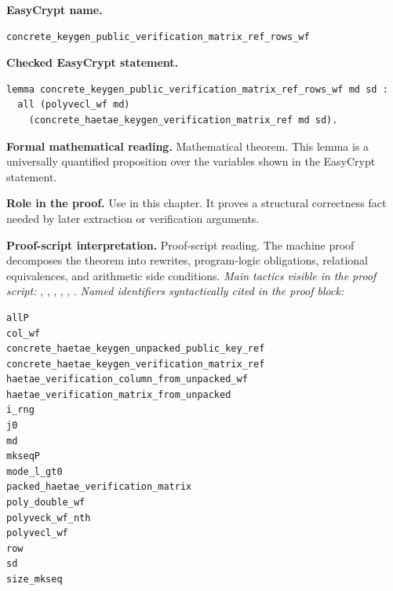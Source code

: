 \begin{formaltheorem}
\noindent\textbf{EasyCrypt name.}
\begin{lstlisting}[language=EasyCrypt,basicstyle=\ttfamily\scriptsize]
concrete_keygen_public_verification_matrix_ref_rows_wf
\end{lstlisting}
\noindent\textbf{Checked EasyCrypt statement.}
\begin{lstlisting}[language=EasyCrypt,basicstyle=\ttfamily\scriptsize]
lemma concrete_keygen_public_verification_matrix_ref_rows_wf md sd :
  all (polyvecl_wf md)
    (concrete_haetae_keygen_verification_matrix_ref md sd).
\end{lstlisting}
\noindent\textbf{Formal mathematical reading.}
Mathematical theorem. This lemma is a universally quantified proposition over the variables shown in the EasyCrypt statement.

\noindent\textbf{Role in the proof.}
Use in this chapter. It proves a structural correctness fact needed by later extraction or verification arguments.

\noindent\textbf{Proof-script interpretation.}
Proof-script reading. The machine proof decomposes the theorem into rewrites, program-logic obligations, relational equivalences, and arithmetic side conditions.
\emph{Main tactics visible in the proof script:} , , , , , .
\emph{Named identifiers syntactically cited in the proof block:}
\begin{lstlisting}[language=EasyCrypt,basicstyle=\ttfamily\scriptsize]
allP
col_wf
concrete_haetae_keygen_unpacked_public_key_ref
concrete_haetae_keygen_verification_matrix_ref
haetae_verification_column_from_unpacked_wf
haetae_verification_matrix_from_unpacked
i_rng
j0
md
mkseqP
mode_l_gt0
packed_haetae_verification_matrix
poly_double_wf
polyveck_wf_nth
polyvecl_wf
row
sd
size_mkseq
\end{lstlisting}

\end{formaltheorem}

